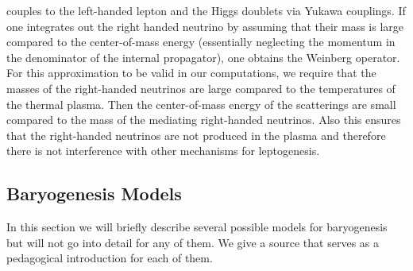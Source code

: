 \documentclass[13pt,a4paper,titlepage]{article}
\begin{document}
couples to the left-handed lepton and the Higgs doublets via Yukawa couplings.
If one integrates out the right handed neutrino by assuming that their mass is
large compared to the center-of-mass energy (essentially neglecting the momentum in the denominator of the internal propagator), one obtains the Weinberg operator.
For this approximation to be valid in our computations, we require that
the masses of the right-handed neutrinos are large compared to the temperatures
of the thermal plasma. Then the center-of-mass energy of the scatterings are
small compared to the mass of the mediating right-handed neutrinos.
Also this ensures that the right-handed neutrinos are not produced in the plasma and therefore there is not interference with other mechanisms for leptogenesis.

\subsection{Baryogenesis Models}
\label{sec:baryogenesis_models}
In this section we will briefly describe several possible models for baryogenesis but will not go into detail for any of them.
We give a source that serves as a pedagogical introduction for each of them.
\end{document}
